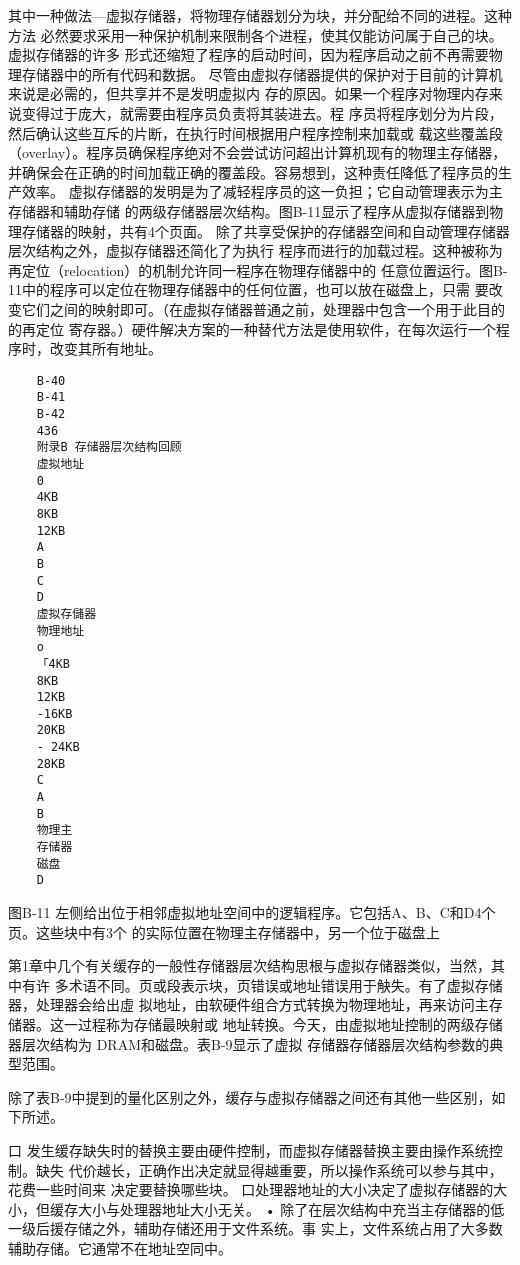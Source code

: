 其中一种做法—虚拟存储器，将物理存储器划分为块，并分配给不同的进程。这种方法
必然要求采用一种保护机制来限制各个进程，使其仅能访问属于自己的块。虚拟存储器的许多
形式还缩短了程序的启动时间，因为程序启动之前不再需要物理存储器中的所有代码和数据。
尽管由虚拟存储器提供的保护对于目前的计算机来说是必需的，但共享并不是发明虚拟内
存的原因。如果一个程序对物理内存来说变得过于庞大，就需要由程序员负责将其装进去。程
序员将程序划分为片段，然后确认这些互斥的片断，在执行时间根据用户程序控制来加载或
载这些覆盖段（overlay）。程序员确保程序绝对不会尝试访问超出计算机现有的物理主存储器，
并确保会在正确的时间加载正确的覆盖段。容易想到，这种责任降低了程序员的生产效率。
虚拟存储器的发明是为了减轻程序员的这一负担；它自动管理表示为主存储器和辅助存储
的两级存储器层次结构。图B-11显示了程序从虚拟存储器到物理存储器的映射，共有4个页面。
除了共享受保护的存储器空间和自动管理存储器层次结构之外，虚拟存储器还简化了为执行
程序而进行的加载过程。这种被称为再定位（relocation）的机制允许同一程序在物理存储器中的
任意位置运行。图B-11中的程序可以定位在物理存储器中的任何位置，也可以放在磁盘上，只需
要改变它们之间的映射即可。（在虚拟存储器普通之前，处理器中包含一个用于此目的的再定位
寄存器。）硬件解决方案的一种替代方法是使用软件，在每次运行一个程序时，改变其所有地址。

\begin{verbatim}
    B-40
    B-41
    B-42
    436
    附录B 存储器层次结构回顾
    虚拟地址
    0
    4KB
    8KB
    12KB
    A
    B
    C
    D
    虚拟存儲器
    物理地址
    o
    「4KB
    8KB
    12KB
    -16KB
    20KB
    - 24KB
    28KB
    C
    A
    B
    物理主
    存储器
    磁盘
    D
\end{verbatim}
图B-11 左侧给出位于相邻虚拟地址空间中的逻辑程序。它包括A、B、C和D4个页。这些块中有3个
的实际位置在物理主存储器中，另一个位于磁盘上

第1章中几个有关缓存的一般性存储器层次结构思根与虚拟存储器类似，当然，其中有许
多术语不同。页或段表示块，页错误或地址错误用于觖失。有了虚拟存储器，处理器会给出虛
拟地址，由软硬件组合方式转换为物理地址，再来访问主存储器。这一过程称为存储最映射或
地址转换。今天，由虚拟地址控制的两级存储器层次结构为 DRAM和磁盘。表B-9显示了虚拟
存储器存储器层次结构参数的典型范围。

除了表B-9中提到的量化区别之外，缓存与虚拟存储器之间还有其他一些区别，如下所述。

口 发生缓存缺失时的替换主要由硬件控制，而虚拟存储器替换主要由操作系统控制。缺失
代价越长，正确作出决定就显得越重要，所以操作系统可以参与其中，花费一些时间来
决定要替换哪些块。
口处理器地址的大小决定了虚拟存储器的大小，但缓存大小与处理器地址大小无关。
• 除了在层次结构中充当主存储器的低一级后援存储之外，辅助存储还用于文件系统。事
实上，文件系统占用了大多数辅助存储。它通常不在地址空同中。

